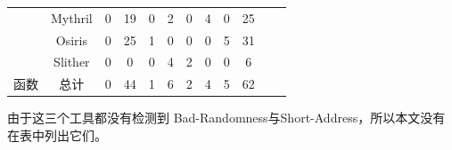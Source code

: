 \begin{table}[]
{\begin{tabular}{@{}cccccccccccc@{}}
 & 
  {\color[HTML]{494949} Mythril} &
  {\color[HTML]{494949} 0} &
  {\color[HTML]{494949} 19} &
  {\color[HTML]{494949} 0} &
  {\color[HTML]{494949} 2} &
  {\color[HTML]{494949} 0}  &
  {\color[HTML]{494949} 4} &
  {\color[HTML]{494949} 0}  &
  25 \\
 &
  {\color[HTML]{494949} Osiris} &
  {\color[HTML]{494949} 0} &
  {\color[HTML]{494949} 25} &
  {\color[HTML]{494949} 1} &
  {\color[HTML]{494949} 0} &
  {\color[HTML]{494949} 0} &
  {\color[HTML]{494949} 0} &
  {\color[HTML]{494949} 5} &
  {\color[HTML]{494949} 31} \\
 &
  {\color[HTML]{494949} Slither} &
  {\color[HTML]{494949} 0} &
  {\color[HTML]{494949} 0} &
  {\color[HTML]{494949} 0} &
  {\color[HTML]{494949} 4} &
  {\color[HTML]{494949} 2} &
  {\color[HTML]{494949} 0} &
  {\color[HTML]{494949} 0} &
  {\color[HTML]{494949} 6} \\ \cmidrule(l){2-12} 
\multirow{-4}{*}{函数} &
  总计 &
  0 &
  44 &
  1 &
  6 &
  2 &
  4 &
  5 &
  62 &
   &
   \\ \bottomrule
\end{tabular}%
}
\label{sol_bug}
\end{table}
\fi
由于这三个工具都没有检测到 Bad-Randomness与Short-Address，所以本文没有在表中列出它们。

\begin{table}[]

\centering
{}
\caption{StackOverflow的漏洞分布}
\label{stack_bug}
\end{table}

